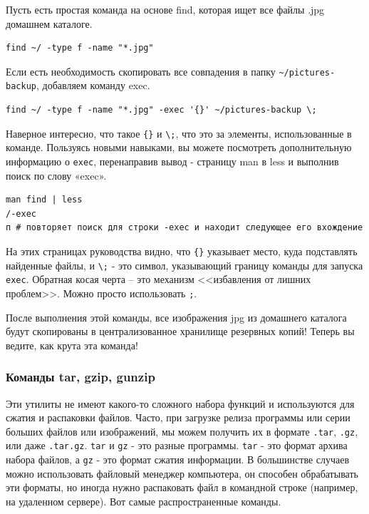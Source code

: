 \documentclass[12pt]{article}
\begin{document}
Пусть есть простая команда на основе find, которая ищет все файлы .jpg
домашнем каталоге.

\begin{verbatim}
find ~/ -type f -name "*.jpg"
\end{verbatim}

Если есть необходимость скопировать все совпадения в папку
\texttt{\textasciitilde{}/pictures-backup}, добавляем команду exec.

\begin{verbatim}
find ~/ -type f -name "*.jpg" -exec '{}' ~/pictures-backup \;
\end{verbatim}

Наверное интересно, что такое
\texttt{\textquotesingle{}\{\}\textquotesingle{}} и
\texttt{\textbackslash{};}, что это за элементы, использованные в
команде. Пользуясь новыми навыками, вы можете посмотреть дополнительную
информацию о \texttt{exec}, перенаправив вывод - страницу man в less и
выполнив поиск по слову «exec».

\begin{verbatim}
man find | less
/-exec
п # повторяет поиск для строки -exec и находит следующее его вхождение
\end{verbatim}

На этих страницах руководства видно, что
\texttt{\textquotesingle{}\{\}\textquotesingle{}} указывает место, куда
подставлять найденные файлы, и \texttt{\textbackslash{};} - это символ,
указывающий границу команды для запуска \texttt{exec}. Обратная косая
черта -- это механизм <<избавления от лишних проблем>>. Можно просто
использовать \texttt{\textquotesingle{};\textquotesingle{}}.

После выполнения этой команды, все изображения jpg из домашнего каталога
будут скопированы в централизованное хранилище резервных копий! Теперь
вы ведите, как крута эта команда!

\hypertarget{tar-gzip-gunzip}{%
\subsubsection{\texorpdfstring{\protect\hyperlink{tar-gzip-gunzip}{}Команды
tar, gzip, gunzip}{Команды tar, gzip, gunzip}}\label{tar-gzip-gunzip}}

Эти утилиты не имеют какого-то сложного набора функций и используются
для сжатия и распаковки файлов. Часто, при загрузке релиза программы или
серии больших файлов или изображений, мы можем получить их в формате
\texttt{.tar}, \texttt{.gz}, или даже \texttt{.tar.gz}. \texttt{tar} и
\texttt{gz} - это разные программы. \texttt{tar} - это формат архива
набора файлов, а \texttt{gz} - это формат сжатия информации. В
большинстве случаев можно использовать файловый менеджер компьютера, он
способен обрабатывать эти форматы, но иногда нужно распаковать файл в
командной строке (например, на удаленном сервере). Вот самые
распространенные команды.
\end{document}

